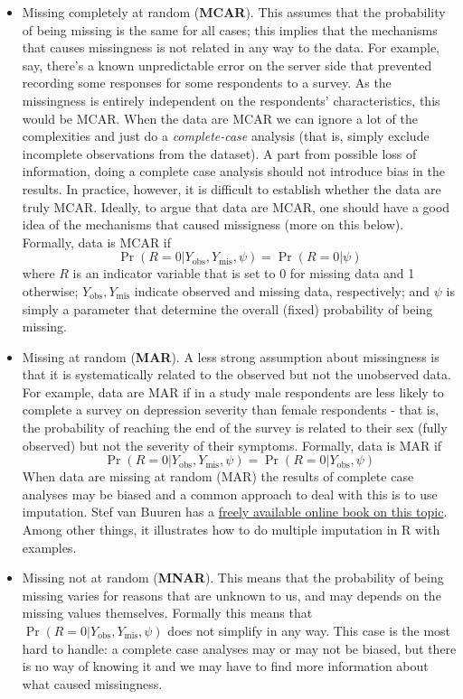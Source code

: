 \documentclass[
]{book}
\begin{document}
\begin{itemize}
\item
  Missing completely at random (\textbf{MCAR}). This assumes that the probability of being missing is the same for all cases; this implies that the mechanisms that causes missingness is not related in any way to the data. For example, say, there's a known unpredictable error on the server side that prevented recording some responses for some respondents to a survey. As the missingness is entirely independent on the respondents' characteristics, this would be MCAR. When the data are MCAR we can ignore a lot of the complexities and just do a \emph{complete-case} analysis (that is, simply exclude incomplete observations from the dataset). A part from possible loss of information, doing a complete case analysis should not introduce bias in the results. In practice, however, it is difficult to establish whether the data are truly MCAR. Ideally, to argue that data are MCAR, one should have a good idea of the mechanisms that caused missigness (more on this below). Formally, data is MCAR if \[
  \Pr(R=0|Y_\mathrm{obs},Y_\mathrm{mis},\psi) = \Pr(R=0|\psi)
  \] where \(R\) is an indicator variable that is set to 0 for missing data and 1 otherwise; \(Y_\mathrm{obs},Y_\mathrm{mis}\) indicate observed and missing data, respectively; and \(\psi\) is simply a parameter that determine the overall (fixed) probability of being missing.
\item
  Missing at random (\textbf{MAR}). A less strong assumption about missingness is that it is systematically related to the observed but not the unobserved data. For example, data are MAR if in a study male respondents are less likely to complete a survey on depression severity than female respondents - that is, the probability of reaching the end of the survey is related to their sex (fully observed) but not the severity of their symptoms. Formally, data is MAR if \[
  \Pr(R=0|Y_\mathrm{obs},Y_\mathrm{mis},\psi) = \Pr(R=0|Y_\mathrm{obs},\psi)
  \] When data are missing at random (MAR) the results of complete case analyses may be biased and a common approach to deal with this is to use imputation. Stef van Buuren has a \href{https://stefvanbuuren.name/fimd/}{freely available online book on this topic}\citep{vanbuuren_imputation}. Among other things, it illustrates how to do multiple imputation in R with examples.
\item
  Missing not at random (\textbf{MNAR}). This means that the probability of being missing varies for reasons that are unknown to us, and may depends on the missing values themselves. Formally this means that \(\Pr(R=0|Y_\mathrm{obs},Y_\mathrm{mis},\psi)\) does not simplify in any way. This case is the most hard to handle: a complete case analyses may or may not be biased, but there is no way of knowing it and we may have to find more information about what caused missingness.
\end{itemize}
\end{document}
